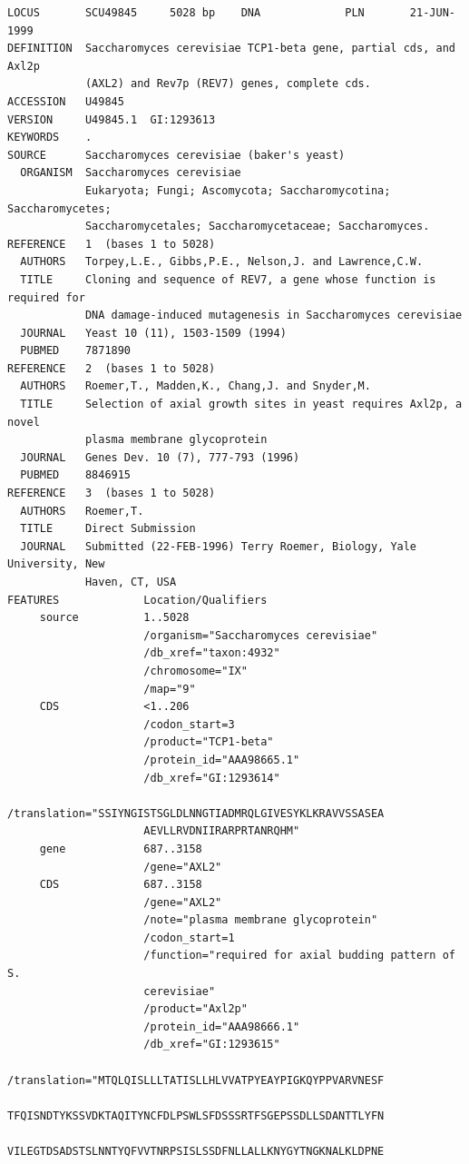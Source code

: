 \documentclass[11pt]{article}
\begin{document}
\begin{verbatim}
LOCUS       SCU49845     5028 bp    DNA             PLN       21-JUN-1999
DEFINITION  Saccharomyces cerevisiae TCP1-beta gene, partial cds, and Axl2p
            (AXL2) and Rev7p (REV7) genes, complete cds.
ACCESSION   U49845
VERSION     U49845.1  GI:1293613
KEYWORDS    .
SOURCE      Saccharomyces cerevisiae (baker's yeast)
  ORGANISM  Saccharomyces cerevisiae
            Eukaryota; Fungi; Ascomycota; Saccharomycotina; Saccharomycetes;
            Saccharomycetales; Saccharomycetaceae; Saccharomyces.
REFERENCE   1  (bases 1 to 5028)
  AUTHORS   Torpey,L.E., Gibbs,P.E., Nelson,J. and Lawrence,C.W.
  TITLE     Cloning and sequence of REV7, a gene whose function is required for
            DNA damage-induced mutagenesis in Saccharomyces cerevisiae
  JOURNAL   Yeast 10 (11), 1503-1509 (1994)
  PUBMED    7871890
REFERENCE   2  (bases 1 to 5028)
  AUTHORS   Roemer,T., Madden,K., Chang,J. and Snyder,M.
  TITLE     Selection of axial growth sites in yeast requires Axl2p, a novel
            plasma membrane glycoprotein
  JOURNAL   Genes Dev. 10 (7), 777-793 (1996)
  PUBMED    8846915
REFERENCE   3  (bases 1 to 5028)
  AUTHORS   Roemer,T.
  TITLE     Direct Submission
  JOURNAL   Submitted (22-FEB-1996) Terry Roemer, Biology, Yale University, New
            Haven, CT, USA
FEATURES             Location/Qualifiers
     source          1..5028
                     /organism="Saccharomyces cerevisiae"
                     /db_xref="taxon:4932"
                     /chromosome="IX"
                     /map="9"
     CDS             <1..206
                     /codon_start=3
                     /product="TCP1-beta"
                     /protein_id="AAA98665.1"
                     /db_xref="GI:1293614"
                     /translation="SSIYNGISTSGLDLNNGTIADMRQLGIVESYKLKRAVVSSASEA
                     AEVLLRVDNIIRARPRTANRQHM"
     gene            687..3158
                     /gene="AXL2"
     CDS             687..3158
                     /gene="AXL2"
                     /note="plasma membrane glycoprotein"
                     /codon_start=1
                     /function="required for axial budding pattern of S.
                     cerevisiae"
                     /product="Axl2p"
                     /protein_id="AAA98666.1"
                     /db_xref="GI:1293615"
                     /translation="MTQLQISLLLTATISLLHLVVATPYEAYPIGKQYPPVARVNESF
                     TFQISNDTYKSSVDKTAQITYNCFDLPSWLSFDSSSRTFSGEPSSDLLSDANTTLYFN
                     VILEGTDSADSTSLNNTYQFVVTNRPSISLSSDFNLLALLKNYGYTNGKNALKLDPNE

\end{verbatim}
\end{document}
